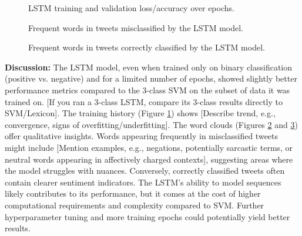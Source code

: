 \documentclass[10pt,twocolumn]{article}
\begin{document}
\begin{figure}[H]
    \centering
    \caption{LSTM training and validation loss/accuracy over epochs.}
    \label{fig:lstm_history}
\end{figure}

\begin{figure}[H]
    \centering
    \caption{Frequent words in tweets misclassified by the LSTM model.}
    \label{fig:lstm_wc_misclassified}
\end{figure}

\begin{figure}[H]
    \centering
    \caption{Frequent words in tweets correctly classified by the LSTM model.}
    \label{fig:lstm_wc_correct}
\end{figure}


\textbf{Discussion:} The LSTM model, even when trained only on binary classification (positive vs. negative) and for a limited number of epochs, showed slightly better performance metrics compared to the 3-class SVM on the subset of data it was trained on. [If you ran a 3-class LSTM, compare its 3-class results directly to SVM/Lexicon]. The training history (Figure \ref{fig:lstm_history}) shows [Describe trend, e.g., convergence, signs of overfitting/underfitting]. The word clouds (Figures \ref{fig:lstm_wc_misclassified} and \ref{fig:lstm_wc_correct}) offer qualitative insights. Words appearing frequently in misclassified tweets might include [Mention examples, e.g., negations, potentially sarcastic terms, or neutral words appearing in affectively charged contexts], suggesting areas where the model struggles with nuances. Conversely, correctly classified tweets often contain clearer sentiment indicators. The LSTM's ability to model sequences likely contributes to its performance, but it comes at the cost of higher computational requirements and complexity compared to SVM. Further hyperparameter tuning and more training epochs could potentially yield better results.
\end{document}
